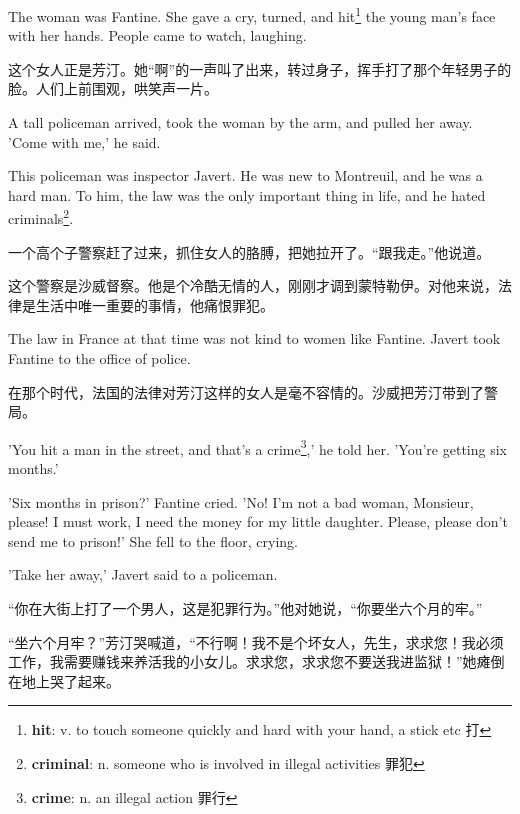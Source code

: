 \documentclass[fontset=ubuntu, zihao=5]{ctexart}
\begin{document}
\begin{paracol}{2}
\switchcolumn*

The woman was Fantine. She gave a cry, turned, and
hit\footnote{\textbf{hit}: v. to touch someone quickly and hard with your
  hand, a stick etc 打} the young man's face with her hands. People came to
watch, laughing.

\switchcolumn

这个女人正是芳汀。她“啊”的一声叫了出来，转过身子，挥手打了那个年轻男子的脸。人们上前围观，哄笑声一片。

\switchcolumn*

A tall policeman arrived, took the woman by the arm, and pulled her away. 'Come with me,' he said.


This policeman was inspector Javert. He was new to Montreuil, and he was a hard man. To him, the law was the only important thing in life, and he hated criminals\footnote{\textbf{criminal}: n. someone who is involved in illegal activities 罪犯}.

\switchcolumn

一个高个子警察赶了过来，抓住女人的胳膊，把她拉开了。“跟我走。”他说道。


这个警察是沙威督察。他是个冷酷无情的人，刚刚才调到蒙特勒伊。对他来说，法律是生活中唯一重要的事情，他痛恨罪犯。

\switchcolumn*

The law in France at that time was not kind to women like Fantine. Javert took Fantine to the office of police.

\switchcolumn

在那个时代，法国的法律对芳汀这样的女人是毫不容情的。沙威把芳汀带到了警局。

\switchcolumn*

'You hit a man in the street, and that's a crime\footnote{\textbf{crime}: n. an illegal action 罪行},' he told her. 'You're getting six months.'


'Six months in prison?' Fantine cried. 'No! I'm not a bad woman, Monsieur, please! I must work, I need the money for my little daughter. Please, please don't send me to prison!' She fell to the floor, crying.

'Take her away,' Javert said to a policeman.

\switchcolumn

“你在大街上打了一个男人，这是犯罪行为。”他对她说，“你要坐六个月的牢。”

“坐六个月牢？”芳汀哭喊道，“不行啊！我不是个坏女人，先生，求求您！我必须工作，我需要赚钱来养活我的小女儿。求求您，求求您不要送我进监狱！”她瘫倒在地上哭了起来。



\end{paracol}
\end{document}
